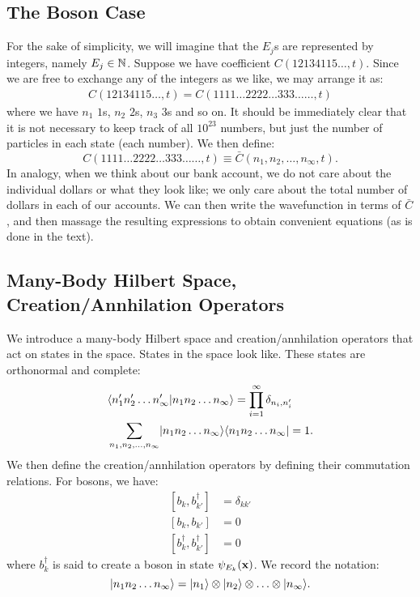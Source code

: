 \subsection{The Boson Case}
For the sake of simplicity, we will imagine that the $E_j$s are represented by integers, namely $E_j \in \mathbb{N}$. Suppose we have coefficient $C(12134115\ldots, t)$. Since we are free to exchange any of the integers as we like, we may arrange it as:
\begin{align*}
    C(12134115\ldots, t) = C(1111\ldots 2222\ldots 333\ldots \ldots, t)
\end{align*}
where we have $n_1$ $1$s, $n_2$ $2$s, $n_3$ $3$s and so on. 
It should be immediately clear that it is not necessary to keep track of all $10^{23}$ numbers, but just the number of particles in each state (each number). We then define:
\begin{equation}
    C(1111\ldots 2222\ldots 333\ldots \ldots, t) \equiv \bar{C}(n_1, n_2, \ldots, n_\infty, t).
\end{equation}
In analogy, when we think about our bank account, we do not care about the individual dollars or what they look like; we only care about the total number of dollars in each of our accounts. We can then write the wavefunction in terms of $\bar{C}$, and then massage the resulting expressions to obtain convenient equations (as is done in the text).

\subsection{Many-Body Hilbert Space, Creation/Annhilation Operators}
We introduce a many-body Hilbert space and creation/annhilation operators that act on states in the space. States in the space look like. These states are orthonormal and complete:
\begin{equation}
    \begin{split}
        &\langle n_1'n_2'\ldots n_\infty' \lvert n_1n_2\ldots n_\infty \rangle = \prod_{i=1}^\infty \delta_{n_i, n_i'}
        \\ &\sum_{n_1, n_2, \ldots, n_\infty} \lvert n_1n_2\ldots n_\infty \rangle\langle n_1n_2\ldots n_\infty \rvert = 1.
    \end{split}
\end{equation}
We then define the creation/annhilation operators by defining their commutation relations. For bosons, we have:
\begin{equation}
    \begin{split}
        [b_k, b_{k'}^\dagger] &= \delta_{kk'}
        \\ [b_k, b_{k'}] &= 0
        \\ [b_k^\dagger, b_{k'}^\dagger] &= 0
    \end{split}
\end{equation}
where $b_k^\dagger$ is said to create a boson in state $\psi_{E_k}(\mathbf{x})$. We record the notation:
\begin{equation}
    \lvert n_1n_2\ldots n_\infty \rangle = \lvert n_1 \rangle\otimes\lvert n_2 \rangle\otimes\ldots\otimes\lvert n_\infty \rangle.
\end{equation}

